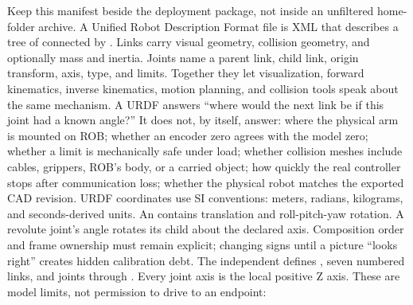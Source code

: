 {}Keep this manifest beside the deployment package, not inside an unfiltered home-folder archive.\markdownRendererInterblockSeparator
{}
\markdownRendererSectionEnd 
\markdownRendererSectionEnd \markdownRendererSectionBegin
{}\markdownRendererInterblockSeparator
{}A Unified Robot Description Format file is XML that describes a tree of  connected by . Links carry visual geometry, collision geometry, and optionally mass and inertia. Joints name a parent link, child link, origin transform, axis, type, and limits. Together they let visualization, forward kinematics, inverse kinematics, motion planning, and collision tools speak about the same mechanism.\markdownRendererParagraphSeparator
{}A URDF answers “where would the next link be if this joint had a known angle?” It does not, by itself, answer:\markdownRendererInterblockSeparator
{}\markdownRendererUlBegin
\markdownRendererUlItem where the physical arm is mounted on ROB;\markdownRendererUlItemEnd 
\markdownRendererUlItem whether an encoder zero agrees with the model zero;\markdownRendererUlItemEnd 
\markdownRendererUlItem whether a limit is mechanically safe under load;\markdownRendererUlItemEnd 
\markdownRendererUlItem whether collision meshes include cables, grippers, ROB's body, or a carried object;\markdownRendererUlItemEnd 
\markdownRendererUlItem how quickly the real controller stops after communication loss;\markdownRendererUlItemEnd 
\markdownRendererUlItem whether the physical robot matches the exported CAD revision.\markdownRendererUlItemEnd 
\markdownRendererUlEnd \markdownRendererInterblockSeparator
{}URDF coordinates use SI conventions: meters, radians, kilograms, and seconds-derived units. An  contains  translation and roll-pitch-yaw rotation. A revolute joint's angle rotates its child about the declared axis. Composition order and frame ownership must remain explicit; changing signs until a picture “looks right” creates hidden calibration debt.\markdownRendererInterblockSeparator
{}\markdownRendererSectionBegin
{}\markdownRendererInterblockSeparator
{}The independent  defines , seven numbered links, and joints  through . Every joint axis is the local positive Z axis. These are model limits, not permission to drive to an endpoint:\markdownRendererInterblockSeparator
